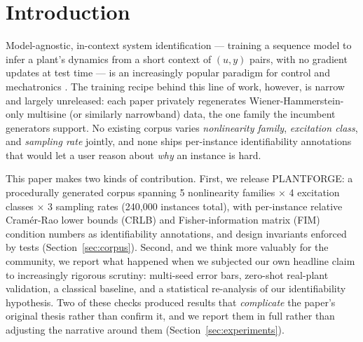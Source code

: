 \documentclass{article}
\begin{document}
\section{Introduction}

Model-agnostic, in-context system identification --- training a sequence model
to infer a plant's dynamics from a short context of $(u, y)$ pairs, with no
gradient updates at test time --- is an increasingly popular paradigm for control
and mechatronics \citep{forgione2023system, piga2024adaptation}. The training
recipe behind this line of work, however, is narrow and largely
unreleased: each paper privately regenerates Wiener-Hammerstein-only multisine (or
similarly narrowband) data, the one family the incumbent generators support. No existing corpus varies
\emph{nonlinearity family}, \emph{excitation class}, and \emph{sampling rate}
jointly, and none ships per-instance identifiability annotations that would let a
user reason about \emph{why} an instance is hard.

This paper makes two kinds of contribution. First, we release PLANTFORGE: a
procedurally generated corpus spanning 5 nonlinearity families $\times$ 4
excitation classes $\times$ 3 sampling rates (240{,}000 instances total), with
per-instance relative Cram\'er-Rao lower bounds (CRLB) and Fisher-information
matrix (FIM) condition numbers as identifiability annotations, and design
invariants enforced by tests (Section~\ref{sec:corpus}). Second, and we think
more valuably for the community, we report what happened when we subjected our
own headline claim to increasingly rigorous scrutiny: multi-seed error bars,
zero-shot real-plant validation, a classical baseline, and a statistical
re-analysis of our identifiability hypothesis. Two of these checks produced
results that \emph{complicate} the paper's original thesis rather than confirm
it, and we report them in full rather than adjusting the narrative around them
(Section~\ref{sec:experiments}).
\end{document}
